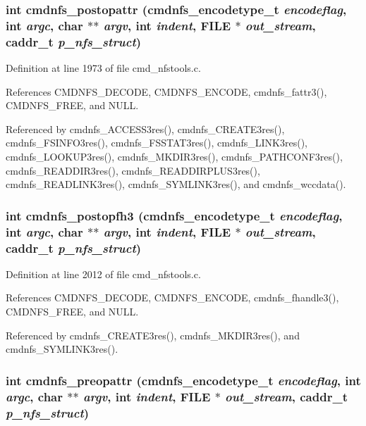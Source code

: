 \subsubsection{\setlength{\rightskip}{0pt plus 5cm}int cmdnfs\_\-postopattr ({\bf cmdnfs\_\-encodetype\_\-t} {\em encodeflag}, int {\em argc}, char $\ast$$\ast$ {\em argv}, int {\em indent}, FILE $\ast$ {\em out\_\-stream}, caddr\_\-t {\em p\_\-nfs\_\-struct})}\label{cmd__nfstools_8c_a86}




Definition at line 1973 of file cmd\_\-nfstools.c.

References CMDNFS\_\-DECODE, CMDNFS\_\-ENCODE, cmdnfs\_\-fattr3(), CMDNFS\_\-FREE, and NULL.

Referenced by cmdnfs\_\-ACCESS3res(), cmdnfs\_\-CREATE3res(), cmdnfs\_\-FSINFO3res(), cmdnfs\_\-FSSTAT3res(), cmdnfs\_\-LINK3res(), cmdnfs\_\-LOOKUP3res(), cmdnfs\_\-MKDIR3res(), cmdnfs\_\-PATHCONF3res(), cmdnfs\_\-READDIR3res(), cmdnfs\_\-READDIRPLUS3res(), cmdnfs\_\-READLINK3res(), cmdnfs\_\-SYMLINK3res(), and cmdnfs\_\-wccdata().
\subsubsection{\setlength{\rightskip}{0pt plus 5cm}int cmdnfs\_\-postopfh3 ({\bf cmdnfs\_\-encodetype\_\-t} {\em encodeflag}, int {\em argc}, char $\ast$$\ast$ {\em argv}, int {\em indent}, FILE $\ast$ {\em out\_\-stream}, caddr\_\-t {\em p\_\-nfs\_\-struct})}\label{cmd__nfstools_8c_a87}




Definition at line 2012 of file cmd\_\-nfstools.c.

References CMDNFS\_\-DECODE, CMDNFS\_\-ENCODE, cmdnfs\_\-fhandle3(), CMDNFS\_\-FREE, and NULL.

Referenced by cmdnfs\_\-CREATE3res(), cmdnfs\_\-MKDIR3res(), and cmdnfs\_\-SYMLINK3res().
\subsubsection{\setlength{\rightskip}{0pt plus 5cm}int cmdnfs\_\-preopattr ({\bf cmdnfs\_\-encodetype\_\-t} {\em encodeflag}, int {\em argc}, char $\ast$$\ast$ {\em argv}, int {\em indent}, FILE $\ast$ {\em out\_\-stream}, caddr\_\-t {\em p\_\-nfs\_\-struct})}\label{cmd__nfstools_8c_a101}




